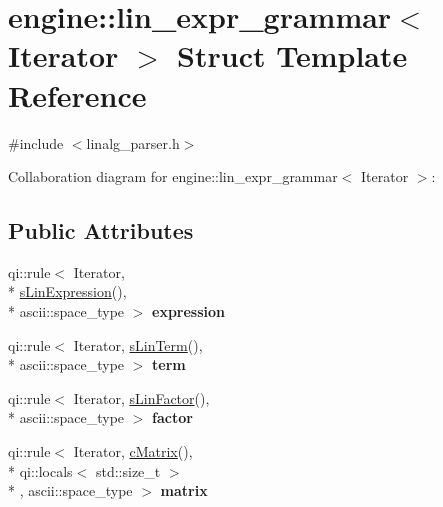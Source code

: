 \hypertarget{structengine_1_1lin__expr__grammar}{\section{engine\-:\-:lin\-\_\-expr\-\_\-grammar$<$ Iterator $>$ Struct Template Reference}
\label{structengine_1_1lin__expr__grammar}
}


{\ttfamily \#include $<$linalg\-\_\-parser.\-h$>$}



Collaboration diagram for engine\-:\-:lin\-\_\-expr\-\_\-grammar$<$ Iterator $>$\-:
\subsection*{Public Attributes}
\begin{DoxyCompactItemize}
\item 
\hypertarget{structengine_1_1lin__expr__grammar_a98cc7da17406b244975cb74b45ff9cb3}{qi\-::rule$<$ Iterator, \\*
\hyperlink{structengine_1_1sLinExpression}{s\-Lin\-Expression}(), \\*
ascii\-::space\-\_\-type $>$ {\bfseries expression}}\label{structengine_1_1lin__expr__grammar_a98cc7da17406b244975cb74b45ff9cb3}

\item 
\hypertarget{structengine_1_1lin__expr__grammar_a24be954b2688602d2111b8bb59a03911}{qi\-::rule$<$ Iterator, \hyperlink{structengine_1_1sLinTerm}{s\-Lin\-Term}(), \\*
ascii\-::space\-\_\-type $>$ {\bfseries term}}\label{structengine_1_1lin__expr__grammar_a24be954b2688602d2111b8bb59a03911}

\item 
\hypertarget{structengine_1_1lin__expr__grammar_ad7e2838134c41692b123d13c8a63ae02}{qi\-::rule$<$ Iterator, \hyperlink{structengine_1_1sLinFactor}{s\-Lin\-Factor}(), \\*
ascii\-::space\-\_\-type $>$ {\bfseries factor}}\label{structengine_1_1lin__expr__grammar_ad7e2838134c41692b123d13c8a63ae02}

\item 
\hypertarget{structengine_1_1lin__expr__grammar_abc4bb74d2dec8bc2014d31ee04249995}{qi\-::rule$<$ Iterator, \hyperlink{structengine_1_1cMatrix}{c\-Matrix}(), \\*
qi\-::locals$<$ std\-::size\-\_\-t $>$\\*
, ascii\-::space\-\_\-type $>$ {\bfseries matrix}}\label{structengine_1_1lin__expr__grammar_abc4bb74d2dec8bc2014d31ee04249995}

\end{DoxyCompactItemize}


